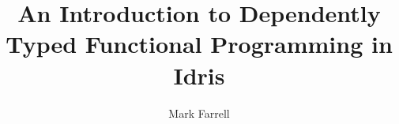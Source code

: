 \documentclass{beamer}
\title{An Introduction to Dependently Typed Functional Programming in Idris}
\author{Mark Farrell}
\begin{document}
  \frame{\titlepage}
  
  
  
  
  
  
  
  
  
  
  
  
  
  
\end{document}
